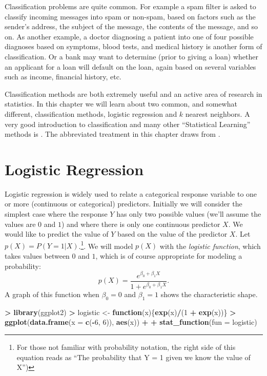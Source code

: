 \documentclass[]{krantz}
\makeatletter
\newenvironment{Shaded}{\begin{snugshade}}{\end{snugshade}}
\newcommand{\ControlFlowTok}[1]{\textcolor[rgb]{0.27,0.27,0.27}{\textbf{#1}}}
\newcommand{\DataTypeTok}[1]{\textcolor[rgb]{0.27,0.27,0.27}{#1}}
\newcommand{\DecValTok}[1]{\textcolor[rgb]{0.06,0.06,0.06}{#1}}
\newcommand{\KeywordTok}[1]{\textcolor[rgb]{0.27,0.27,0.27}{\textbf{#1}}}
\newcommand{\NormalTok}[1]{#1}
\newcommand{\OperatorTok}[1]{\textcolor[rgb]{0.43,0.43,0.43}{\textbf{#1}}}
\newcommand{\StringTok}[1]{\textcolor[rgb]{0.5,0.5,0.5}{#1}}
\newenvironment{kframe}{%
\medskip{}
\setlength{\fboxsep}{.8em}
 \def\at@end@of@kframe{}%
 \ifinner\ifhmode%
  \def\at@end@of@kframe{\end{minipage}}%
  \begin{minipage}{\columnwidth}%
 \fi\fi%
 \def\FrameCommand##1{\hskip\@totalleftmargin \hskip-\fboxsep
 \colorbox{shadecolor}{##1}\hskip-\fboxsep
     \hskip-\linewidth \hskip-\@totalleftmargin \hskip\columnwidth}%
 \MakeFramed {\advance\hsize-\width
   \@totalleftmargin\z@ \linewidth\hsize
   \@setminipage}}%
 {\par\unskip\endMakeFramed%
 \at@end@of@kframe}
\renewenvironment{Shaded}{\begin{kframe}}{\end{kframe}}
\makeatother
\begin{document}
Classification problems are quite common. For example a spam filter is asked to classify incoming messages into spam or non-spam, based on factors such as the sender's address, the subject of the message, the contents of the message, and so on. As another example, a doctor diagnosing a patient into one of four possible diagnoses based on symptoms, blood tests, and medical history is another form of classification. Or a bank may want to determine (prior to giving a loan) whether an applicant for a loan will default on the loan, again based on several variables such as income, financial history, etc.

Classification methods are both extremely useful and an active area of research in statistics. In this chapter we will learn about two common, and somewhat different, classification methods, logistic regression and \(k\) nearest neighbors. A very good introduction to classification and many other ``Statistical Learning'' methods is \citet{JamesEtAl}. The abbreviated treatment in this chapter draws from \citet{JamesEtAl}.

\hypertarget{logistic-regression}{%
\section{Logistic Regression}\label{logistic-regression}}

Logistic regression is widely used to relate a categorical response variable to one or more (continuous or categorical) predictors. Initially we will consider the simplest case where the response \(Y\) has only two possible values (we'll assume the values are \(0\) and \(1\)) and where there is only one continuous predictor \(X\). We would like to predict the value of \(Y\) based on the value of the predictor \(X\). Let \(p(X) = P(Y = 1 | X)\).\footnote{For those not familiar with probability notation, the right side of this equation reads as ``The probability that Y = 1 given we know the value of X'')}. We will model \(p(X)\) with the \emph{logistic function}, which takes values between \(0\) and \(1\), which is of course appropriate for modeling a probability:
\[
p(X) = \frac{e^{\beta_0 + \beta_1 X}}{1 + e^{\beta_0 + \beta_1 X}}.
\]
A graph of this function when \(\beta_0=0\) and \(\beta_1 = 1\) shows the characteristic shape.

\begin{Shaded}
\begin{Highlighting}[]
\OperatorTok{>}\StringTok{ }\KeywordTok{library}\NormalTok{(ggplot2)}
\OperatorTok{>}\StringTok{ }\NormalTok{logistic <-}\StringTok{ }\ControlFlowTok{function}\NormalTok{(x)\{}\KeywordTok{exp}\NormalTok{(x)}\OperatorTok{/}\NormalTok{(}\DecValTok{1} \OperatorTok{+}\StringTok{ }\KeywordTok{exp}\NormalTok{(x))\}}
\OperatorTok{>}\StringTok{ }\KeywordTok{ggplot}\NormalTok{(}\KeywordTok{data.frame}\NormalTok{(}\DataTypeTok{x =} \KeywordTok{c}\NormalTok{(}\OperatorTok{-}\DecValTok{6}\NormalTok{, }\DecValTok{6}\NormalTok{)), }\KeywordTok{aes}\NormalTok{(x)) }\OperatorTok{+}
\OperatorTok{+}\StringTok{   }\KeywordTok{stat_function}\NormalTok{(}\DataTypeTok{fun =}\NormalTok{ logistic)}
\end{Highlighting}
\end{Shaded}
\end{document}
